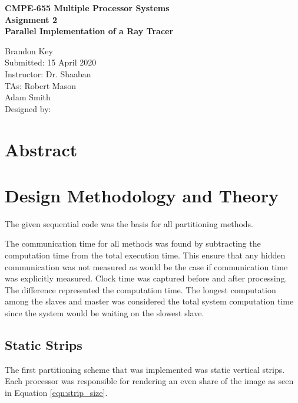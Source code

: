 \documentclass[11pt]{article}
\begin{document}
%
%

\vspace*{6 cm}

\begin{center}
\bf{CMPE-655 Multiple Processor Systems\\
    Asignment 2\\
\vspace{0.25 cm}
Parallel Implementation of a Ray Tracer
}
\end{center}

\vspace{6 cm}

\begin{flushright}
Brandon Key\\
Submitted: 15 April 2020\\
\vspace{0.5 cm}
Instructor: Dr. Shaaban\\
TAs: Robert Mason \\
Adam Smith\\
Designed by: \\
\vspace{0.5 cm}
\end{flushright}



\newpage

\section{Abstract}
	
	
	

\section{Design Methodology and Theory}

	The given sequential code was the basis for all partitioning methods. 
	
	The communication time for all methods was found by subtracting the computation time from the total execution time. This ensure that any hidden communication was not measured as would be the case if communication time was explicitly measured. Clock time was captured before and after processing. The difference represented the computation time. The longest computation among the slaves and master was considered the total system computation time since the system would be waiting on the slowest slave. 
	

	\subsection{Static Strips}
		The first partitioning scheme that was implemented was static vertical strips. Each processor was responsible for rendering an even share of the image as seen in Equation \ref{eqn:strip_size}.
		
\end{document}
